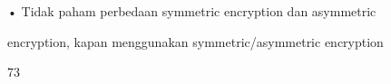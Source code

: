 \documentclass{article}
\begin{document}

• Tidak paham perbedaan symmetric encryption dan asymmetric 

encryption, kapan menggunakan symmetric/asymmetric encryption

73
\end{document}
